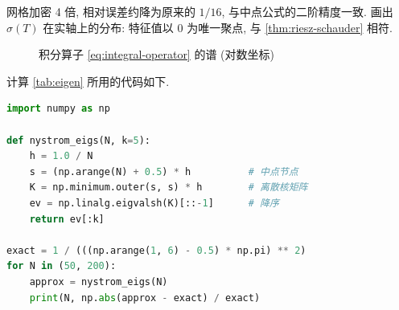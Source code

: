 网格加密 4 倍, 相对误差约降为原来的 $1/16$, 与中点公式的二阶精度一致.  画出 $\sigma(T)$ 在实轴上的分布: 特征值以 $0$ 为唯一聚点, 与 \cref{thm:riesz-schauder} 相符.

\begin{figure}[htbp]
\centering

\caption{积分算子 \cref{eq:integral-operator} 的谱 (对数坐标)}\label{fig:spectrum}
\end{figure}

计算 \cref{tab:eigen} 所用的代码如下.

\begin{lstlisting}[language=Python]
import numpy as np

def nystrom_eigs(N, k=5):
    h = 1.0 / N
    s = (np.arange(N) + 0.5) * h          # 中点节点
    K = np.minimum.outer(s, s) * h        # 离散核矩阵
    ev = np.linalg.eigvalsh(K)[::-1]      # 降序
    return ev[:k]

exact = 1 / (((np.arange(1, 6) - 0.5) * np.pi) ** 2)
for N in (50, 200):
    approx = nystrom_eigs(N)
    print(N, np.abs(approx - exact) / exact)
\end{lstlisting}
